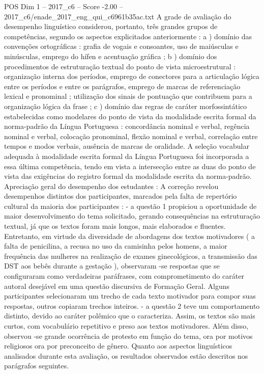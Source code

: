 \begin{textsample}{POS Dim 1 – 2017\_c6 – Score -2.00 – 2017\_c6/enade\_2017\_eng\_qui\_c6961b35ac.txt}
A grade de avaliação do desempenho linguístico considerou, portanto, três grandes grupos de competências, segundo os aspectos explicitados anteriormente : a ) domínio das convenções ortográficas : grafia de vogais e consoantes, uso de maiúsculas e minúsculas, emprego do hífen e acentuação gráfica ; b ) domínio dos procedimentos de estruturação textual do ponto de vista microestrutural : organização interna dos períodos, emprego de conectores para a articulação lógica entre os períodos e entre os parágrafos, emprego de marcas de referenciação lexical e pronominal ; utilização dos sinais de pontuação que contribuem para a organização lógica da frase ; c ) domínio das regras de caráter morfossintático estabelecidas como modelares do ponto de vista da modalidade escrita formal da norma-padrão da Língua Portuguesa : concordância nominal e verbal, regência nominal e verbal, colocação pronominal, flexão nominal e verbal, correlação entre tempos e modos verbais, ausência de marcas de oralidade.
A seleção vocabular adequada à modalidade escrita formal da Língua Portuguesa foi incorporada a essa última competência, tendo em vista a intersecção entre as duas do ponto de vista das exigências do registro formal da modalidade escrita da norma-padrão.
Apreciação geral do desempenho dos estudantes : A correção revelou desempenhos distintos dos participantes, marcados pela falta de repertório cultural da maioria dos participantes : - a questão 1 propiciou a oportunidade de maior desenvolvimento do tema solicitado, gerando consequências na estruturação textual, já que os textos foram mais longos, mais elaborados e fluentes.
Entretanto, em virtude da diversidade de abordagens dos textos motivadores ( a falta de penicilina, a recusa no uso da camisinha pelos homens, a maior frequência das mulheres na realização de exames ginecológicos, a transmissão das DST aos bebês durante a gestação ), observaram -se respostas que se configuraram como verdadeiras paráfrases, com comprometimento do caráter autoral desejável em uma questão discursiva de Formação Geral.
Alguns participantes selecionaram um trecho de cada texto motivador para compor suas respostas, outros copiaram trechos inteiros. - a questão 2 teve um comportamento distinto, devido ao caráter polêmico que o caracteriza.
Assim, os textos são mais curtos, com vocabulário repetitivo e preso aos textos motivadores.
Além disso, observou -se grande ocorrência de protesto em função do tema, ora por motivos religiosos ora por preconceito de gênero.
Quanto aos aspectos linguísticos analisados durante esta avaliação, os resultados observados estão descritos nos parágrafos seguintes.

\end{textsample}
